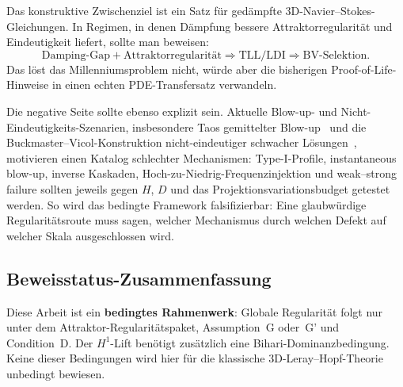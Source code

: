 \documentclass[12pt,a4paper]{article}
\theoremstyle{definition}
\theoremstyle{plain}
\theoremstyle{remark}
\begin{document}
Das konstruktive Zwischenziel ist ein Satz für gedämpfte
3D-Navier--Stokes-Gleichungen.  In Regimen, in denen Dämpfung bessere
Attraktorregularität und Eindeutigkeit liefert, sollte man beweisen:
\[
  \text{Damping-Gap} + \text{Attraktorregularität}
  \Longrightarrow
  \mathrm{TLL/LDI}
  \Longrightarrow
  \mathrm{BV\text{-}Selektion}.
\]
Das löst das Millenniumsproblem nicht, würde aber die bisherigen
Proof-of-Life-Hinweise in einen echten PDE-Transfersatz verwandeln.

Die negative Seite sollte ebenso explizit sein.  Aktuelle Blow-up- und
Nicht-Eindeutigkeits-Szenarien, insbesondere Taos gemittelter Blow-up~\cite{Tao2016}
und die Buckmaster--Vicol-Konstruktion nicht-eindeutiger schwacher L\"osungen~\cite{BuckmasterVicol2019}, motivieren einen Katalog schlechter
Mechanismen: Type-I-Profile, instantaneous blow-up, inverse Kaskaden,
Hoch-zu-Niedrig-Frequenzinjektion und weak--strong failure sollten jeweils
gegen $H$, $D$ und das Projektionsvariationsbudget getestet werden.  So
wird das bedingte Framework falsifizierbar: Eine glaubwürdige
Regularitätsroute muss sagen, welcher Mechanismus durch welchen Defekt
auf welcher Skala ausgeschlossen wird.

\subsection*{Beweisstatus-Zusammenfassung}

Diese Arbeit ist ein \textbf{bedingtes Rahmenwerk}: Globale Regularität folgt nur unter dem Attraktor-Regularitätspaket, Assumption~G oder~G' und Condition~D.  Der $H^1$-Lift benötigt zusätzlich eine Bihari-Dominanzbedingung.  Keine dieser Bedingungen wird hier für die klassische 3D-Leray--Hopf-Theorie unbedingt bewiesen.
\end{document}
